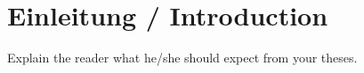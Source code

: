 
\chapter{Einleitung / Introduction}
\label{sec:intro}

Explain the reader what he/she should expect from your theses.


